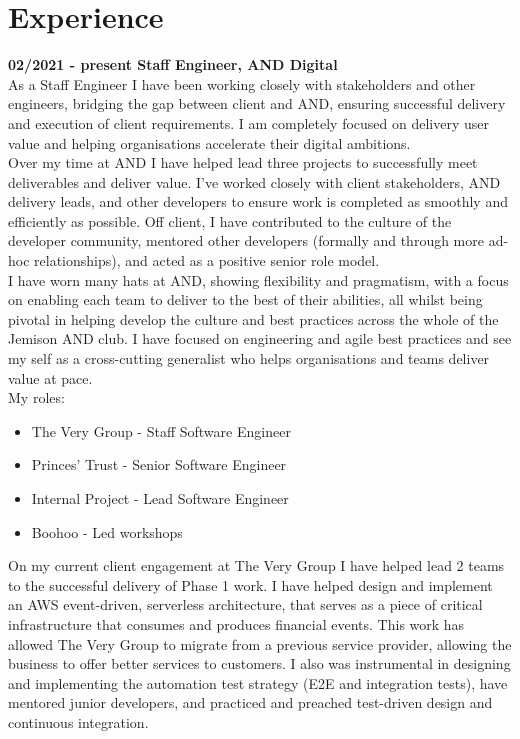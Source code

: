 \section{Experience}

\textbf{02/2021 - present \hspace{2.75em}Staff Engineer, AND Digital}\\

As a Staff Engineer I have been working closely with stakeholders and other engineers, bridging the gap between client and AND, ensuring successful delivery and execution of client requirements. I am completely focused on delivery user value and helping organisations accelerate their digital ambitions.\\

Over my time at AND I have helped lead three projects to successfully meet deliverables and deliver value. I’ve worked closely with client stakeholders, AND delivery leads, and other developers to ensure work is completed as smoothly and efficiently as possible. Off client, I have contributed to the culture of the developer community, mentored other developers (formally and through more ad-hoc relationships), and acted as a positive senior role model.\\

I have worn many hats at AND, showing flexibility and pragmatism, with a focus on enabling each team to deliver to the best of their abilities, all whilst being pivotal in helping develop the culture and best practices across the whole of the Jemison AND club. I have focused on engineering and agile best practices and see my self as a cross-cutting generalist who helps organisations and teams deliver value at pace.\\

My roles:\\

\begin{itemize}
  \item The Very Group   - Staff Software Engineer
  \item Princes' Trust   - Senior Software Engineer
  \item Internal Project - Lead Software Engineer
  \item Boohoo           - Led workshops
\end{itemize}

\bigskip

On my current client engagement at The Very Group I have helped lead 2 teams to the successful delivery of Phase 1 work. I have helped design and implement an AWS event-driven, serverless architecture, that serves as a piece of critical infrastructure that consumes and produces financial events. This work has allowed The Very Group to migrate from a previous service provider, allowing the business to offer better services to customers. I also was instrumental in designing and implementing the automation test strategy (E2E and integration tests), have mentored junior developers, and practiced and preached test-driven design and continuous integration.\\

